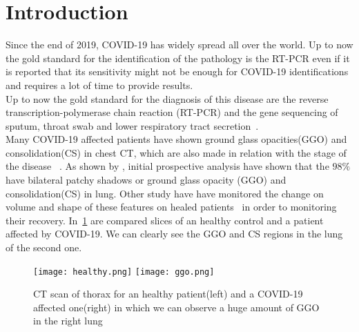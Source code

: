 \documentclass{standalone}
\begin{document}
\chapter*{Introduction}


Since the end of 2019, COVID-19 has widely spread all over the world. Up to now the gold standard for the identification of the pathology is the RT-PCR even if it is reported that its sensitivity might not be enough for COVID-19 identifications~\cite{ART:Ai} and requires a lot of time to provide results.\\
Up to now the gold standard for the diagnosis of this disease are the reverse transcription-polymerase chain reaction (RT-PCR) and the gene sequencing of sputum, throat swab and lower respiratory tract secretion~\cite{ART:Zhao}.\\ Many COVID-19 affected patients have shown ground glass opacities(GGO) and consolidation(CS) in chest CT, which are also made in relation with the stage of the disease ~\cite{ART:Bernheim}.  As shown by \cite{ART:Huang}, initial prospective analysis have shown that the $98\%$ have bilateral patchy shadows or ground glass opacity (GGO) and consolidation(CS) in lung. Other study have have monitored the change on volume and shape of these features on healed patients~\cite{ART:Ai} in order to monitoring their recovery. In \figurename\,\ref{fig:HealthVSCovid} are compared slices of an healthy control and a patient affected by COVID-19. We can clearly see the GGO and CS regions in the lung of the second one.\\
	
\begin{figure}[h!]
	\centering
	\texttt{[image: healthy.png]}
	\quad
	\texttt{[image: ggo.png]}
	\label{fig:HealthVSCovid}\caption{CT scan of thorax for an healthy patient(left) and a COVID-19 affected one(right) in which we can observe a huge amount of GGO in the right lung}
\end{figure} 
\end{document}
